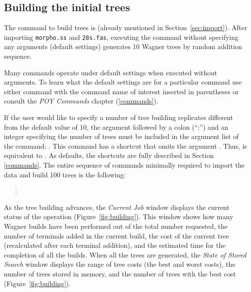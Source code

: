 {\subsection{Building the initial trees}

The command to build trees is  (already mentioned in Section~\ref{sec:import}). After 
importing \texttt{morpho.ss} and \texttt{28s.fas}, executing the command  without specifying 
any arguments (default settings) generates 10 Wagner trees by random addition sequence.

Many \poy commands operate under default settings when executed without arguments. To learn what the default settings 
are for a particular command use either  command with the command name of interest inserted in parentheses or 
consult the \emph{POY Commands} chapter (\ref{commands}).

If the user would like to specify a number of tree building replicates different from the default value of 10, the argument 
 followed by a colon (``:'') and an integer specifying the number of trees must be included in the 
argument list of the  command: . This command has a shortcut 
that omits the argument . Thus,  is equivalent to . 
As defaults, the shortcuts are fully described in Section \ref{commands}. The entire sequence of commands minimally required 
to import the data and build 100 trees is the following:

\begin{quote}
 	\\
\end{quote}

As the tree building advances, the \emph{Current Job} window displays the current status of the operation (Figure~\ref{fig:building}). 
This window shows how many Wagner builds have been performed out of the total number requested, the number of terminals added
 in the current build, the cost of the current tree (recalculated after each terminal addition), and the estimated time for the completion of 
 all the builds. When all the trees are generated, the \emph{State of Stored Search} window displays the range of tree costs (the best 
 and worst costs), the number of trees stored in memory, and the number of trees with the best cost (Figure~\ref{fig:building}).

}
